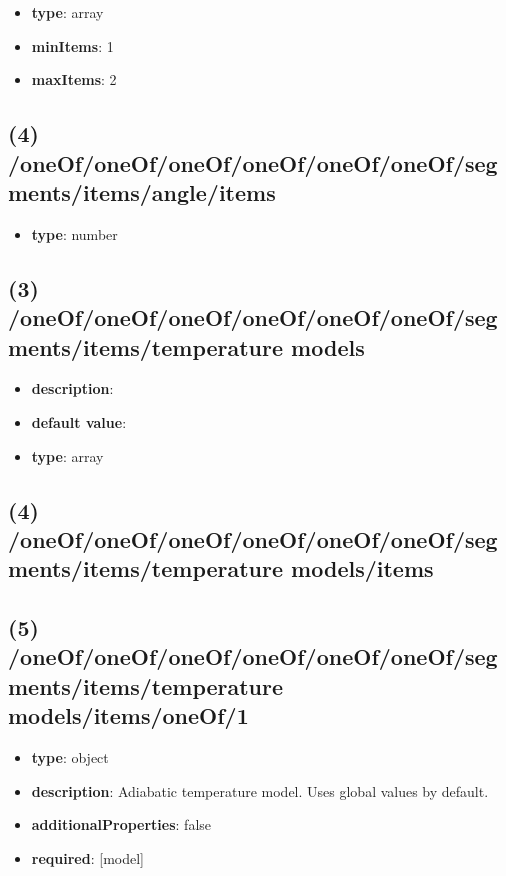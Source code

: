 \begin{itemize}[leftmargin=3em]\item {\bf type}: array
\item {\bf minItems}: 1
\item {\bf maxItems}: 2
\end{itemize}\subsection{(4) /oneOf/oneOf/oneOf/oneOf/oneOf/oneOf/segments/items/angle/items}
\begin{itemize}[leftmargin=4em]\item {\bf type}: number
\end{itemize}\subsection{(3) /oneOf/oneOf/oneOf/oneOf/oneOf/oneOf/segments/items/temperature models}
\begin{itemize}[leftmargin=3em]\item {\bf description}: 
\item {\bf default value}: 
\item {\bf type}: array
\end{itemize}\subsection{(4) /oneOf/oneOf/oneOf/oneOf/oneOf/oneOf/segments/items/temperature models/items}

\subsection{(5) /oneOf/oneOf/oneOf/oneOf/oneOf/oneOf/segments/items/temperature models/items/oneOf/1}
\begin{itemize}[leftmargin=5em]\item {\bf type}: object
\item {\bf description}: Adiabatic temperature model. Uses global values by default.
\item {\bf additionalProperties}: false
\item {\bf required}: [model]\end{itemize}
